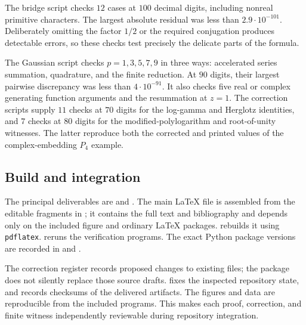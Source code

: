 The bridge script checks $12$ cases at $100$ decimal digits, including
nonreal primitive characters. The largest absolute residual was
less than $2.9\cdot10^{-101}$. Deliberately omitting the factor
$1/2$ or the required conjugation produces detectable errors, so
these checks test precisely the delicate parts of the formula.

The Gaussian script checks $p=1,3,5,7,9$ in three ways: accelerated
series summation, quadrature, and the finite reduction.
At $90$ digits, their largest pairwise discrepancy was less than
$4\cdot10^{-91}$. It also checks five real or complex generating
function arguments and the resummation at $z=1$.
The correction scripts supply $11$ checks at $70$ digits for the
log-gamma and Herglotz identities, and $7$ checks at $80$ digits
for the modified-polylogarithm and root-of-unity witnesses.
The latter reproduce both the corrected and printed values of the
complex-embedding $P_4$ example.

\subsection{Build and integration}

The principal deliverables are
 and
. The main \LaTeX{} file is
assembled from the editable fragments in ; it
contains the full text and bibliography and depends only on the
included figure and ordinary \LaTeX{} packages.
 rebuilds it using \texttt{pdflatex}.
 reruns the verification programs.
The exact Python package versions are recorded in
 and .

The correction register records proposed changes to existing files;
the package does not silently replace those source drafts.
 fixes the inspected repository state, and
 records checksums of the delivered artifacts.
The figures and data are reproducible from the included programs.
This makes each proof, correction, and finite witness independently
reviewable during repository integration.
